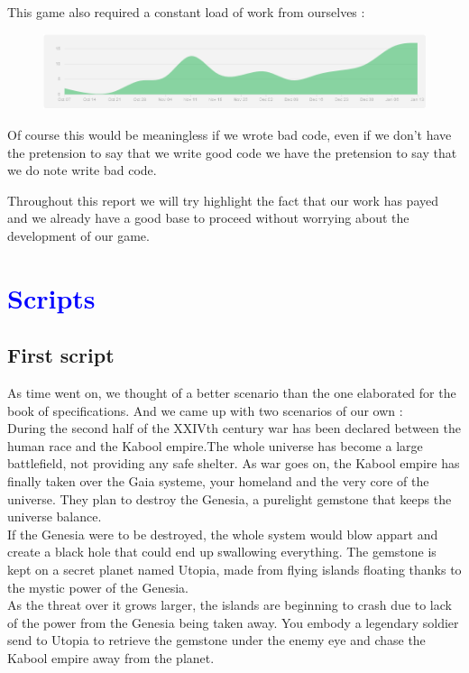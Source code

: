 \documentclass[article]{report} %
\begin{document}
			This game also required a constant load of work from ourselves : 
			\begin{figure}[h]
				\includegraphics[width=18cm]{images/Schemas/stats.png}
			\end{figure}

 			Of course this would be meaningless if we wrote bad code, even if we don't have the pretension to say that we write good code we have the pretension to say that  we do note write bad code.

 			Throughout this report we will try highlight the fact that our work has payed and we already have a good base to proceed without worrying about the development of our game.


								
  		\chapter{\textcolor{blue}{Scripts}}
			\section{First script}
				As time went on, we thought of a better scenario than the one elaborated for the book of specifications. 
				And we came up with two scenarios of our own : \\

				During the second half of the XXIVth century war has been declared between the human race and the Kabool empire.The whole universe 					has become a large battlefield, not providing any safe shelter. As war goes on, the Kabool empire has finally taken over the Gaia systeme, 					your homeland and the very core of the universe. They plan to destroy the Genesia, a purelight gemstone that keeps the universe balance.\\

				 If the Genesia were to be destroyed, the whole system would blow appart and create a black hole that could end up swallowing 						everything. The gemstone is kept on a secret planet named Utopia, made from flying islands floating thanks to the mystic power of the 					Genesia.\\

 				As the threat over it grows larger, the islands are beginning to crash due to lack of the power from the Genesia being taken away. You embody a legendary soldier send to Utopia to retrieve the gemstone under the enemy eye and chase the Kabool empire away from the 					planet.\\
\end{document}
